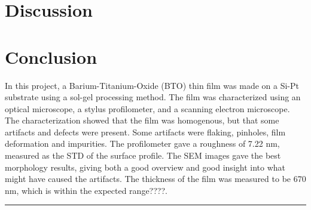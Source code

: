 \documentclass[5p,sort&compress]{elsarticle}
\begin{document}
\section{Discussion}


\section{Conclusion}

\noindent In this project, a Barium-Titanium-Oxide (BTO) thin film was made on a Si-Pt substrate using a sol-gel processing method.
The film was characterized using an optical microscope, a stylus profilometer, and a scanning electron microscope.
The characterization showed that the film was homogenous, but that some artifacts and defects were present.
Some artifacts were flaking, pinholes, film deformation and impurities.
The profilometer gave a roughness of 7.22 nm, measured as the STD of the surface profile.
The SEM images gave the best morphology results, giving both a good overview and good insight into what might have caused the artifacts.
The thickness of the film was measured to be 670 nm, which is within the expected range????.



\begingroup
\begin{center}
  \rule{2cm}{.4pt}
\end{center}
\makeatletter
{}
\makeatother



\endgroup
\end{document}
